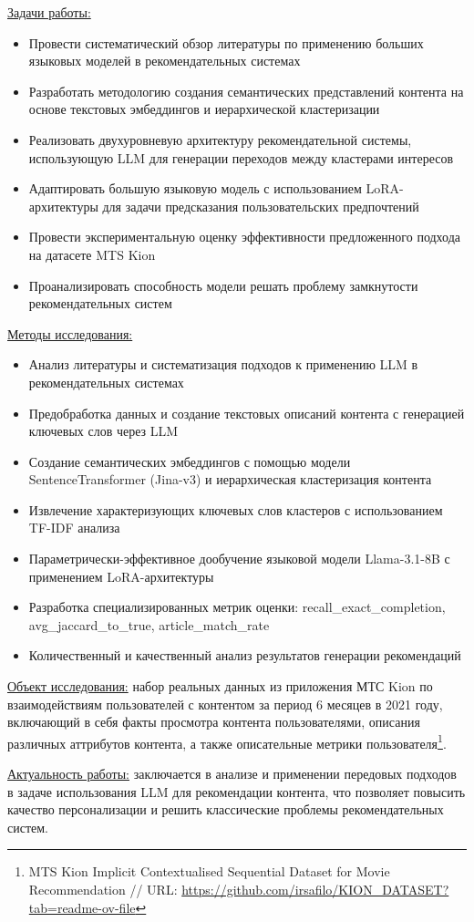 \underline{Задачи работы:}
\begin{itemize}
    \item Провести систематический обзор литературы по применению больших языковых моделей в рекомендательных системах
    \item Разработать методологию создания семантических представлений контента на основе текстовых эмбеддингов и иерархической кластеризации
    \item Реализовать двухуровневую архитектуру рекомендательной системы, использующую LLM для генерации переходов между кластерами интересов
    \item Адаптировать большую языковую модель с использованием LoRA-архитектуры для задачи предсказания пользовательских предпочтений
    \item Провести экспериментальную оценку эффективности предложенного подхода на датасете MTS Kion
    \item Проанализировать способность модели решать проблему замкнутости рекомендательных систем
\end{itemize}

\underline{Методы исследования:}
\begin{itemize}
    \item Анализ литературы и систематизация подходов к применению LLM в рекомендательных системах
    \item Предобработка данных и создание текстовых описаний контента с генерацией ключевых слов через LLM
    \item Создание семантических эмбеддингов с помощью модели SentenceTransformer (Jina-v3) и иерархическая кластеризация контента
    \item Извлечение характеризующих ключевых слов кластеров с использованием TF-IDF анализа
    \item Параметрически-эффективное дообучение языковой модели Llama-3.1-8B с применением LoRA-архитектуры
    \item Разработка специализированных метрик оценки: recall\_exact\_completion, avg\_jaccard\_to\_true, article\_match\_rate
    \item Количественный и качественный анализ результатов генерации рекомендаций
\end{itemize}

\underline{Объект исследования:} набор реальных данных из приложения МТС Kion по взаимодействиям пользователей с контентом за период 6 месяцев в 2021 году, включающий в себя факты просмотра контента пользователями, описания различных аттрибутов контента, а также описательные метрики пользователя\footnote{MTS Kion Implicit Contextualised Sequential Dataset for Movie Recommendation // URL: \url{https://github.com/irsafilo/KION_DATASET?tab=readme-ov-file}}.

\underline{Актуальность работы:} заключается в анализе и применении передовых подходов в задаче использования LLM для рекомендации контента, что позволяет повысить качество персонализации и решить классические проблемы рекомендательных систем. 